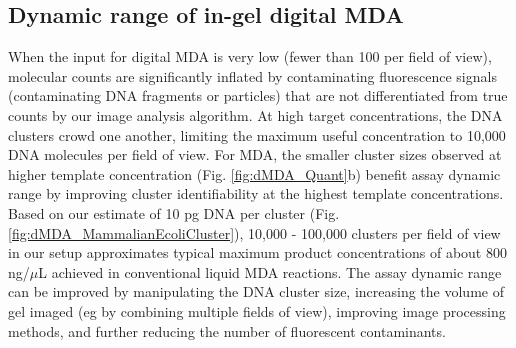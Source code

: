 \subsection{Dynamic range of in-gel digital MDA}
When the input for digital MDA is very low (fewer than 100 per field of view), molecular counts are significantly inflated by contaminating fluorescence signals (contaminating DNA fragments or particles) that are not differentiated from true counts by our image analysis algorithm. At high target concentrations, the DNA clusters crowd one another, limiting the maximum useful concentration to 10,000 DNA molecules per field of view. For MDA, the smaller cluster sizes observed at higher template concentration (Fig. \ref{fig:dMDA_Quant}b) benefit assay dynamic range by improving cluster identifiability at the highest template concentrations. Based on our estimate of 10 pg DNA per cluster (Fig. \ref{fig:dMDA_MammalianEcoliCluster}), 10,000 - 100,000 clusters per field of view in our setup approximates typical maximum product concentrations of about 800 ng\slash $\mu$L achieved in conventional liquid MDA reactions. The assay dynamic range can be improved by manipulating the DNA cluster size, increasing the volume of gel imaged (eg by combining multiple fields of view), improving image processing methods, and further reducing the number of fluorescent contaminants. 

